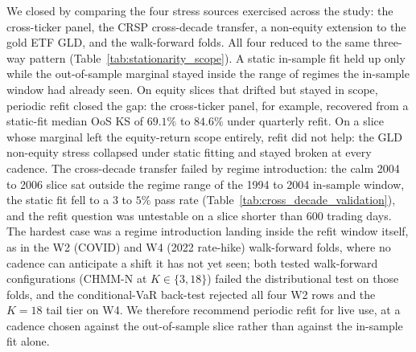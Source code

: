 We closed by comparing the four stress sources exercised across the study: the cross-ticker panel, the CRSP cross-decade transfer, a non-equity extension to the gold ETF GLD, and the walk-forward folds. All four reduced to the same three-way pattern (Table~\ref{tab:stationarity_scope}). A static in-sample fit held up only while the out-of-sample marginal stayed inside the range of regimes the in-sample window had already seen. On equity slices that drifted but stayed in scope, periodic refit closed the gap: the cross-ticker panel, for example, recovered from a static-fit median OoS KS of $69.1\%$ to $84.6\%$ under quarterly refit. On a slice whose marginal left the equity-return scope entirely, refit did not help: the GLD non-equity stress collapsed under static fitting and stayed broken at every cadence. The cross-decade transfer failed by regime introduction: the calm 2004 to 2006 slice sat outside the regime range of the 1994 to 2004 in-sample window, the static fit fell to a $3$ to $5\%$ pass rate (Table~\ref{tab:cross_decade_validation}), and the refit question was untestable on a slice shorter than $600$ trading days. The hardest case was a regime introduction landing inside the refit window itself, as in the W2 (COVID) and W4 (2022 rate-hike) walk-forward folds, where no cadence can anticipate a shift it has not yet seen; both tested walk-forward configurations (CHMM-N at $K \in \{3, 18\}$) failed the distributional test on those folds, and the conditional-VaR back-test rejected all four W2 rows and the $K = 18$ tail tier on W4. We therefore recommend periodic refit for live use, at a cadence chosen against the out-of-sample slice rather than against the in-sample fit alone.

